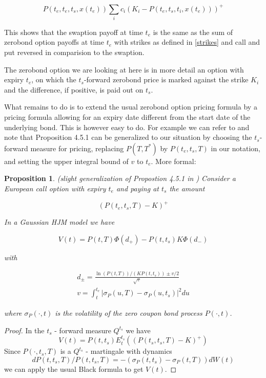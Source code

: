 \documentclass{amsart}
\theoremstyle{plain}
\newtheorem{proposition}{Proposition}
\numberwithin{equation}{section}
\begin{document}
\begin{equation}\label{zerobondoption}
P(t_e,t_e,t_s,x(t_e)) \sum_i c_i \left( K_i - P(t_e,t_s,t_i,x(t_e)) \right)^+
\end{equation}

This shows that the swaption payoff at time $t_e$ is the same as the sum of zerobond option payoffs at time $t_e$ with strikes as defined in \ref{strikes} and call and put reversed in comparision to the swaption.

The zerobond option we are looking at here is in more detail an option with expiry $t_e$, on which the $t_s$-forward zerobond price is marked against the strike $K_i$ and the difference, if positive, is paid out on $t_s$.

What remains to do is to extend the usual zerobond option pricing formula by a pricing formula allowing for an expiry date different from the start date of the underlying bond. This is however easy to do. For example we can refer to \cite{piterbarg} and note that Proposition 4.5.1 can be generalized to our situation by choosing the $t_s$-forward measure for pricing, replacing $P(T,T^*)$ by $P(t_e,t_s,T)$ in our notation, and setting the upper integral bound of $v$ to $t_e$. More formal:

\begin{proposition}
(slight generalization of Propostion 4.5.1 in \cite{piterbarg}) Consider a European call option with expiry $t_e$ and paying at $t_s$ the amount

\begin{equation}
(P(t_e,t_s,T)-K)^+
\end{equation}

In a Gaussian HJM model we have

\begin{equation}
V(t) = P(t,T)\Phi(d_+) - P(t,t_s)K\Phi(d_-)
\end{equation}

with

\begin{eqnarray}
d_{\pm} = \frac{\ln(P(t,T))/(KP(t,t_s)) \pm v/2}{\sqrt{v}} \\
v = \int_t^{t_e} | \sigma_P(u,T) - \sigma_P(u,t_s) |^2 du
\end{eqnarray}

where $\sigma_P(\cdot,t)$ is the volatility of the zero coupon bond process $P(\cdot,t)$.

\end{proposition}

\begin{proof}
In the $t_s$ - forward measure $Q^{t_s}$ we have
\begin{equation}
V(t) = P(t,t_s) E^{t_s}_t \left( (P(t_s,t_s,T)-K)^+ \right)
\end{equation}
Since $P(\cdot,t_s,T)$ is a $Q^{t_s}$ - martingale with dynamics
\begin{equation}
dP(t,t_s,T)/P(t,t_s,T) = - ( \sigma_P(t,t_s) - \sigma_P(t,T) ) dW(t)
\end{equation}
we can apply the usual Black formula to get $V(t)$.
\end{proof}
\end{document}
